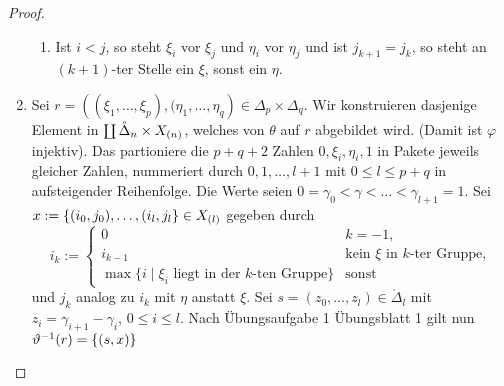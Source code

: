 \begin{proof}
\begin{enumerate}[label=(\alph*)]
\begin{enumerate}[label=(\roman*)]
        \item Ist $i<j$, so steht $\xi_i$ vor $\xi_j$ und $\eta_i$ vor $\eta_j$
          und ist $j_{k+1} = j_k$, so steht an $(k+1)$-ter Stelle
          ein $\xi$, sonst ein $\eta$.
      \end{enumerate}
    \item Sei $r = \left( (\xi_1,\ldots,\xi_p),(\eta_1,\ldots,\eta_q \right)\in
      \Delta_p\times\Delta_q$. Wir konstruieren dasjenige Element in 
      $\coprod \mathring\Delta_n\times X_{(n)}$, welches von $\theta$ auf $r$
      abgebildet wird. (Damit ist $\varphi$ injektiv). Das partioniere die
      $p+q+2$ Zahlen $0,\xi_i,\eta_i,1$ in Pakete jeweils gleicher Zahlen,
      nummeriert durch $0,1,\ldots,l+1$ mit $0\leq l\leq p+q$ in aufsteigender
      Reihenfolge.
      Die Werte seien $0=\gamma_0 < \gamma < \ldots < \gamma_{l+1} = 1$.
      Sei $x := \{(i_0,j_0),\ldots, (i_l,j_l\} \in X_{(l)}$ gegeben durch
      \[i_k := \begin{cases}
        0 & k = -1,\\
        i_{k-1} & \text{kein $\xi$ in $k$-ter Gruppe},\\
        \max\{ i \mid \xi_i \text{ liegt in der $k$-ten Gruppe}\} &
          \text{sonst}
        \end{cases}\]
      und $j_k$ analog zu $i_k$ mit $\eta$ anstatt $\xi$.
      Sei $s = (z_0,\ldots,z_l) \in \mathring\Delta_l$ mit $z_i =
      \gamma_{i+1}-\gamma_i$, $0\leq i\leq l$. Nach Übungsaufgabe 1 Übungsblatt
      1 gilt nun $\vartheta^{-1}(r) = \{(s,x)\}$ 
     
  \end{enumerate}
\end{proof}

